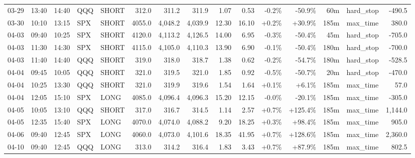 \documentclass[11pt,a4paper,twoside]{article}
\begin{document}
\begin{landscape}
\begin{center}
\begin{longtable}{>{\color{txtmain}}l l l l l r r r r r r r r >{\color{txtmain}}l r}
03-29 & 13:40 & 14:40 & QQQ & SHORT & 312.0 & 311.2 & 311.9 & 1.07 & 0.53 & \textcolor{lossred}{-0.2\%} & \textcolor{lossred}{-50.9\%} & 60m & hard\_stop & \textcolor{lossred}{-490.5} \\
03-30 & 10:10 & 13:15 & SPX & SHORT & 4055.0 & 4,048.2 & 4,039.9 & 12.30 & 16.10 & \textcolor{wingreen}{+0.2\%} & \textcolor{wingreen}{+30.9\%} & 185m & max\_time & \textcolor{wingreen}{380.0} \\
04-03 & 09:40 & 10:25 & SPX & SHORT & 4120.0 & 4,113.2 & 4,126.5 & 14.00 & 6.95 & \textcolor{lossred}{-0.3\%} & \textcolor{lossred}{-50.4\%} & 45m & hard\_stop & \textcolor{lossred}{-705.0} \\
04-03 & 11:30 & 14:30 & SPX & SHORT & 4115.0 & 4,105.0 & 4,110.3 & 13.90 & 6.90 & \textcolor{lossred}{-0.1\%} & \textcolor{lossred}{-50.4\%} & 180m & hard\_stop & \textcolor{lossred}{-700.0} \\
04-03 & 11:40 & 14:40 & QQQ & SHORT & 319.0 & 318.0 & 318.7 & 1.38 & 0.62 & \textcolor{lossred}{-0.2\%} & \textcolor{lossred}{-54.7\%} & 180m & hard\_stop & \textcolor{lossred}{-528.5} \\
04-04 & 09:45 & 10:05 & QQQ & SHORT & 321.0 & 319.5 & 321.0 & 1.85 & 0.92 & \textcolor{lossred}{-0.5\%} & \textcolor{lossred}{-50.7\%} & 20m & hard\_stop & \textcolor{lossred}{-470.0} \\
04-04 & 10:25 & 13:30 & QQQ & SHORT & 321.0 & 319.9 & 319.6 & 1.54 & 1.64 & \textcolor{wingreen}{+0.1\%} & \textcolor{wingreen}{+6.1\%} & 185m & max\_time & \textcolor{wingreen}{57.0} \\
04-04 & 12:05 & 15:10 & SPX & LONG & 4085.0 & 4,096.4 & 4,096.3 & 15.20 & 12.15 & \textcolor{lossred}{-0.0\%} & \textcolor{lossred}{-20.1\%} & 185m & max\_time & \textcolor{lossred}{-305.0} \\
04-05 & 10:05 & 13:10 & QQQ & SHORT & 317.0 & 316.7 & 314.5 & 1.14 & 2.57 & \textcolor{wingreen}{+0.7\%} & \textcolor{wingreen}{+125.4\%} & 185m & max\_time & \textcolor{wingreen}{1,144.0} \\
04-05 & 12:35 & 15:40 & SPX & LONG & 4070.0 & 4,074.0 & 4,088.2 & 9.20 & 18.25 & \textcolor{wingreen}{+0.3\%} & \textcolor{wingreen}{+98.4\%} & 185m & max\_time & \textcolor{wingreen}{905.0} \\
04-06 & 09:40 & 12:45 & SPX & LONG & 4060.0 & 4,073.0 & 4,101.6 & 18.35 & 41.95 & \textcolor{wingreen}{+0.7\%} & \textcolor{wingreen}{+128.6\%} & 185m & max\_time & \textcolor{wingreen}{2,360.0} \\
04-10 & 09:40 & 12:45 & QQQ & LONG & 313.0 & 314.2 & 316.4 & 1.83 & 3.43 & \textcolor{wingreen}{+0.7\%} & \textcolor{wingreen}{+87.9\%} & 185m & max\_time & \textcolor{wingreen}{802.5} \\

\end{longtable}
\end{center}
\end{landscape}
\end{document}

